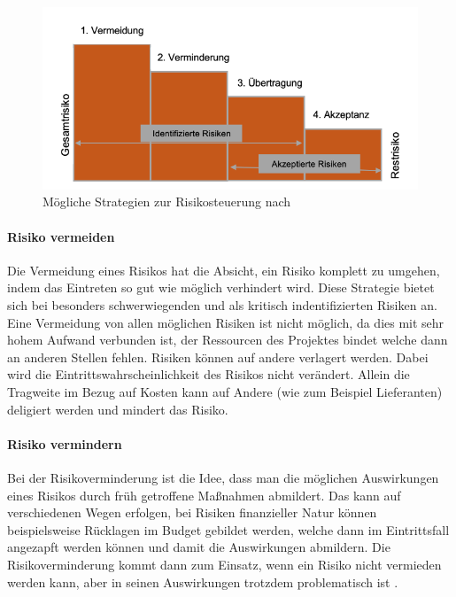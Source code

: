 \documentclass[ThesisDJ.tex]{subfiles}
\begin{document}
\begin{figure}
    \centering
    \includegraphics[width=\linewidth]{risiken.png}
    \caption{Mögliche Strategien zur Risikosteuerung nach \cite{cicek2022risikomanagement}}
    \label{fig:riskstrats}
\end{figure}

\paragraph{Risiko vermeiden}
Die Vermeidung eines Risikos hat die Absicht, ein Risiko komplett zu umgehen, indem das Eintreten so gut wie möglich verhindert wird. Diese Strategie bietet sich bei besonders schwerwiegenden und als kritisch indentifizierten Risiken an. Eine Vermeidung von allen möglichen Risiken ist nicht möglich, da dies mit sehr hohem Aufwand verbunden ist, der Ressourcen des Projektes bindet welche dann an anderen Stellen fehlen.
Risiken können auf andere verlagert werden. Dabei wird die Eintrittswahrscheinlichkeit des Risikos nicht verändert. Allein die Tragweite im Bezug auf Kosten kann auf Andere (wie zum Beispiel Lieferanten) deligiert werden und mindert das Risiko.


\paragraph{Risiko vermindern}
Bei der Risikoverminderung ist die Idee, dass man die möglichen Auswirkungen eines Risikos durch früh getroffene Maßnahmen abmildert. Das kann auf verschiedenen Wegen erfolgen, bei Risiken finanzieller Natur können beispielsweise Rücklagen im Budget gebildet werden, welche dann im Eintrittsfall angezapft werden können und damit die Auswirkungen abmildern. Die Risikoverminderung kommt dann zum Einsatz, wenn ein Risiko nicht vermieden werden kann, aber in seinen Auswirkungen trotzdem problematisch ist \cite{dechange_projektmanagement_2024}.
\end{document}
